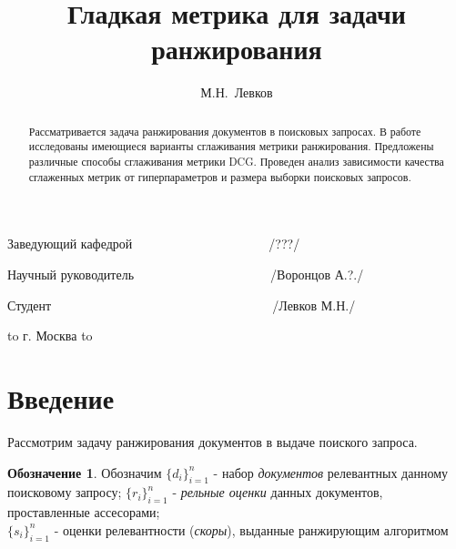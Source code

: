 \documentclass[12pt,a4paper]{amsart}
\theoremstyle{definition}
\theoremstyle{definition}
\newtheorem{designation}{Обозначение}[section]
\newenvironment{nouppercase}{%
  \let\uppercase\relax%
  \renewcommand{\uppercasenonmath}[1]{}}{}
\renewcommand\i{\textit}
\begin{document}
\begin{titlepage}
Заведующий кафедрой \verb"           " \underline{\quad \quad \quad \quad \quad \quad \quad}
\verb"        "
/???/

Научный руководитель \verb"           " \underline{\quad \quad \quad \quad \quad \quad \quad}
\verb"        "
/Воронцов А.?./

Студент \verb"                        " \underline{\quad \quad \quad \quad \quad \quad \quad}
\verb"        "
/Левков М.Н./

\vspace{1.0cm}

\hbox to \textwidth
{
\hss г. Москва \hss
}
\hbox to \textwidth
{
 \hss
}

\end{titlepage}


\title{Гладкая метрика для задачи ранжирования}

\author{М.Н.~Левков}


\begin{abstract}
Рассматривается задача ранжирования документов в поисковых запросах. В работе исследованы имеющиеся варианты сглаживания метрики ранжирования. Предложены различные способы сглаживания метрики DCG. Проведен анализ зависимости качества сглаженных метрик от гиперпараметров и размера выборки поисковых запросов.
\end{abstract}


\begin{nouppercase}
\maketitle
\end{nouppercase}

\tableofcontents

\pagebreak


\section{Введение}

Рассмотрим задачу ранжирования документов в выдаче поиского запроса.
\begin{designation}
Обозначим $\{d_i\}_{i=1}^n$ - набор \i{документов} релевантных данному поисковому запросу; 
$\{r_i\}_{i=1}^n$ - \i{рельные оценки} данных документов, проставленные ассесорами; \\
$\{s_i\}_{i=1}^n$ - оценки релевантности (\i{скоры}), выданные ранжирующим алгоритмом
\end{designation}
\end{document}

